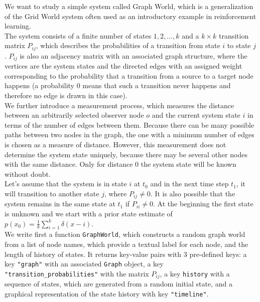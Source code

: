 \documentclass{tstextbook}
\begin{document}
\begin{example}
We want to study a simple system called Graph World, which is a generalization of the Grid World system often used as an introductory example in reinforcement learning.\\

The system consists of a finite number of states $1,2,\ldots,k$ and a $k\times k$ transition matrix $P_{ij}$, which describes the probabilities of a transition from state $i$ to state $j$. $P_{ij}$ is also an adjacency matrix with an associated graph structure, where the vertices are the system states and the directed edges with an assigned weight corresponding to the probability that a transition from a source to a target node happens (a probability $0$ means that such a transition never happens and therefore no edge is drawn in this case).\\

We further introduce a measurement process, which measures the distance between an arbitrarily selected observer node $o$ and the current system state $i$ in terms of the number of edges between them. Because there can be many possible paths between two nodes in the graph, the one with a minimum number of edges is chosen as a measure of distance. However, this measurement does not determine the system state uniquely, because there may be several other nodes with the same distance. Only for distance $0$ the system state will be known without doubt. \\

Let's assume that the system is in state $i$ at $t_0$ and in the next time step $t_1$, it will transition to another state $j$, where $P_{ij}\neq 0$. It is also possible that the system remains in the same state at $t_1$ if $P_{ii}\neq 0$. At the beginning the first state is unknown and we start with a prior state estimate of $p(x_0)=\frac{1}{k}\sum_{i=1}^{k}\delta(x-i)$.\\

We write first a function \texttt{GraphWorld}, which constructs a random graph world from a list of node names, which provide a textual label for each node, and the length of history of states. It returns key-value pairs with 3 pre-defined keys: a key \texttt{"graph"} with an associated \texttt{Graph} object, a key \texttt{"transition\_probabilities"} with the matrix $P_{ij}$, a key \texttt{history} with a sequence of states, which are generated from a random initial state, and a graphical representation of the state history with key \texttt{"timeline"}.


\end{example}
\end{document}
